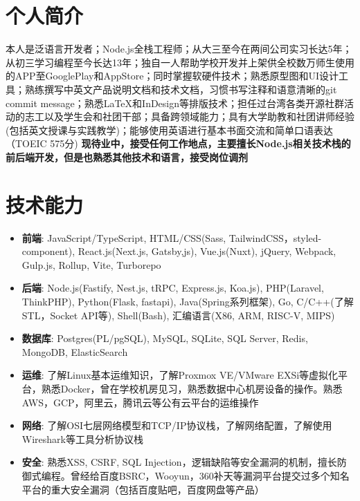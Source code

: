 \documentclass{resume}
\begin{document}
\sloppy



\section{ 个人简介}
    本人是泛语言开发者；Node.js全栈工程师；从大三至今在两间公司实习长达5年；从初三学习编程至今长达13年；独自一人帮助学校开发并上架供全校数万师生使用的APP至GooglePlay和AppStore；同时掌握软硬件技术；熟悉原型图和UI设计工具；熟练撰写中英文产品说明文档和技术文档，习惯书写注释和语意清晰的git commit message；熟悉\LaTeX 和InDesign等排版技术；担任过台湾各类开源社群活动的志工以及学生会和社团干部；具备跨领域能力；具有大学助教和社团讲师经验(包括英文授课与实践教学)；能够使用英语进行基本书面交流和简单口语表达（TOEIC 575分)
    \newline \textbf{现待业中，接受任何工作地点，主要擅长Node.js相关技术栈的前后端开发，但是也熟悉其他技术和语言，接受岗位调剂}

\section{ 技术能力}
    \begin{itemize}
      \item \textbf{前端}: JavaScript/TypeScript, HTML/CSS(Sass, TailwindCSS，styled-component), React.js(Next.js, Gatsby,js), Vue.js(Nuxt), jQuery, Webpack, Gulp.js, Rollup, Vite, Turborepo
      \item \textbf{后端}: Node.js(Fastify, Nest.js, tRPC, Express.js, Koa.js), PHP(Laravel, ThinkPHP), Python(Flask, fastapi), Java(Spring系列框架), Go, C/C++(了解STL，Socket API等), Shell(Bash), 汇编语言(X86, ARM, RISC-V, MIPS)
      \item \textbf{数据库}: Postgres(PL/pgSQL), MySQL, SQLite, SQL Server, Redis, MongoDB, ElasticSearch
      \item \textbf{运维}: 了解Linux基本运维知识，了解Proxmox VE/VMware EXSi等虚拟化平台，熟悉Docker，曾在学校机房见习，熟悉数据中心机房设备的操作。熟悉AWS，GCP，阿里云，腾讯云等公有云平台的运维操作
      \item \textbf{网络}: 了解OSI七层网络模型和TCP/IP协议栈，了解网络配置，了解使用Wireshark等工具分析协议栈
      \item \textbf{安全}: 熟悉XSS, CSRF, SQL Injection，逻辑缺陷等安全漏洞的机制，擅长防御式编程。曾经给百度BSRC，Wooyun，360补天等漏洞平台提交过多个知名平台的重大安全漏洞（包括百度贴吧，百度网盘等产品）
    \end{itemize}
\end{document}
